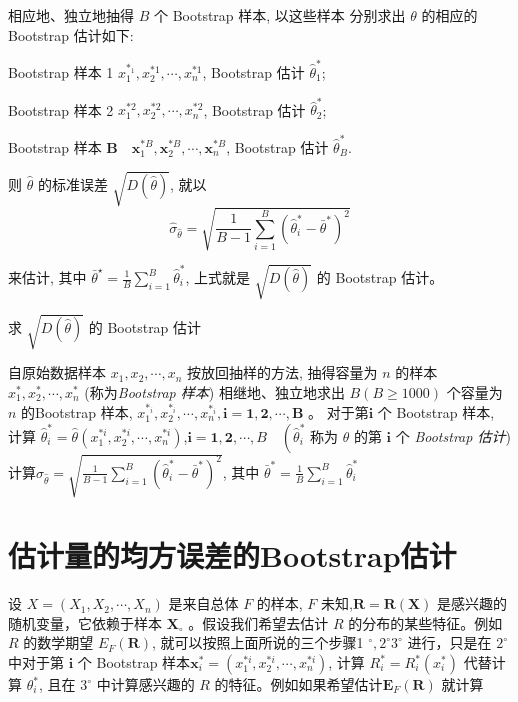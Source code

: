 相应地、独立地抽得 $ B $ 个 Bootstrap 样本, 以这些样本 分别求出 $ \theta $ 的相应的 Bootstrap 估计如下:

Bootstrap 样本 1 $ x_{1}^{*_{1}}, x_{2}^{* 1}, \cdots, x_{n}^{* 1} $, Bootstrap 估计 $ \hat{\theta}_{1}^{*} $;

Bootstrap 样本 2 $ x_{1}^{* 2}, x_{2}^{* 2}, \cdots, x_{n}^{* 2} $, Bootstrap 估计 $ \hat{\theta}_{2}^{*} $;

Bootstrap 样本 $ \boldsymbol{B} \quad \boldsymbol{x}_{1}^{* B}, \boldsymbol{x}_{2}^{* B}, \cdots, \boldsymbol{x}_{n}^{* B} $, Bootstrap 估计 $ \hat{\theta}_{B}^{*} $.

则 $ \hat{\theta} $ 的标准误差 $ \sqrt{D(\hat{\theta})} $, 就以
$$
\hat{\sigma}_{\hat{\theta}}=\sqrt{\frac{1}{B-1} \sum_{i=1}^{B}\left(\hat{\theta}_{i}^{*}-\bar{\theta}^{*}\right)^{2}}
$$

来估计, 其中 $ \bar{\theta}^{\star}=\frac{1}{B} \sum_{i=1}^{B} \hat{\theta}_{i}^{*} $, 上式就是 $ \sqrt{D(\hat{\theta})} $ 的 Bootstrap 估计。

\begin{algorithm}
    \caption{求 $ \sqrt{D(\hat{\theta})} $ 的 Bootstrap 估计}
    自原始数据样本 $ x_{1}, x_{2}, \cdots, x_{n} $ 按放回抽样的方法, 抽得容量为 $ n $ 的样本 $ x_{1}^{*}, x_{2}^{*}, \cdots, x_{n}^{*} $ (称为\textit{Bootstrap 样本})\;
    相继地、独立地求出 $ B(B \geq 1000) $ 个容量为 $ n $ 的Bootstrap 样本, $ x_{1}^{*_{i}}, x_{2}^{*_{i}}, \cdots, x_{n}^{*_{i}}, \boldsymbol{i}=\mathbf{1}, \mathbf{2}, \cdots, \boldsymbol{B} $ 。 对于第$ \boldsymbol{i} $ 个 Bootstrap 样本, 计算 $ \hat{\theta}_{i}^{*}=\hat{\theta}\left(x_{1}^{* i}, x_{2}^{* i}, \cdots, x_{n}^{* i}\right) $,$ \boldsymbol{i}=\mathbf{1}, \mathbf{2}, \cdots, B \quad\left(\hat{\theta}_{i}^{*}\right. $ 称为 $ \theta $ 的第 $ \boldsymbol{i} $ 个 \textit{Bootstrap 估计})\;
    计算$ \hat{\sigma}_{\hat{\theta}}=\sqrt{\frac{1}{B-1} \sum_{i=1}^{B}\left(\hat{\theta}_{i}^{*}-\bar{\theta}^{*}\right)^{2}} $, 其中 $ \bar{\theta}^{*}=\frac{1}{B} \sum_{i=1}^{B} \hat{\theta}_{i}^{*} $
\end{algorithm}

\section{估计量的均方误差的Bootstrap估计}

设 $ X=\left(X_{1}, X_{2}, \cdots, X_{n}\right) $ 是来自总体 $ F $ 的样本, $ F $ 未知,$ \boldsymbol{R}=\boldsymbol{R}(\boldsymbol{X}) $ 是感兴趣的随机变量，它依赖于样本 $ \boldsymbol{X}_{\circ} $ 。假设我们希望去估计 $ R $ 的分布的某些特征。例如 $ R $ 的数学期望 $ E_{F}(\boldsymbol{R}) $, 就可以按照上面所说的三个步骤1 $ ^{\circ}, 2^{\circ} $$ 3^{\circ} $ 进行，只是在 $ 2^{\circ} $ 中对于第 $ \boldsymbol{i} $ 个 Bootstrap 样本$ \boldsymbol{x}_{i}^{*}=\left(x_{1}^{* i}, x_{2}^{* i}, \cdots, x_{n}^{* i}\right) $, 计算 $ R_{i}^{*}=R_{i}^{*}\left(x_{i}^{*}\right) $ 代替计算 $ \theta_{i}^{*} $, 且在 $ 3^{\circ} $ 中计算感兴趣的 $ R $ 的特征。例如如果希望估计$ \boldsymbol{E}_{F}(\boldsymbol{R}) $ 就计算

